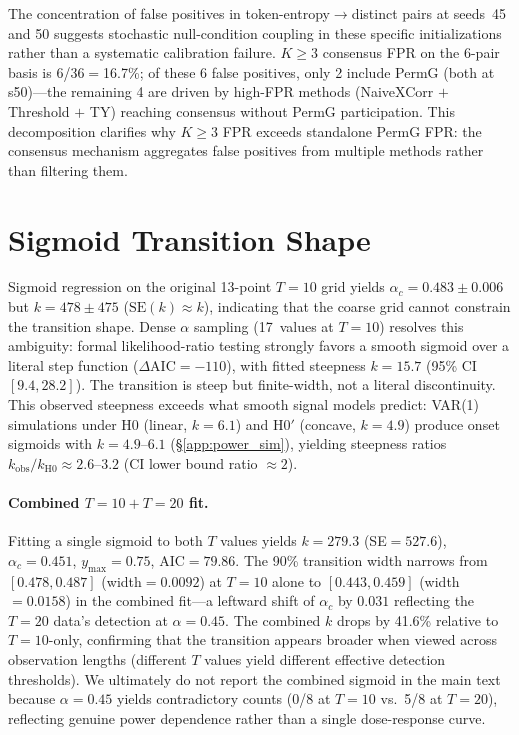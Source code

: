 The concentration of false positives in token-entropy$\to$distinct pairs at seeds~45 and 50 suggests stochastic null-condition coupling in these specific initializations rather than a systematic calibration failure.
$K{\geq}3$ consensus FPR on the 6-pair basis is 6/36${=}$16.7\%; of these 6 false positives, only 2 include PermG (both at s50)---the remaining 4 are driven by high-FPR methods (NaiveXCorr $+$ Threshold $+$ TY) reaching consensus without PermG participation.
This decomposition clarifies why $K{\geq}3$ FPR exceeds standalone PermG FPR: the consensus mechanism aggregates false positives from multiple methods rather than filtering them.

\FloatBarrier
\section{Sigmoid Transition Shape}
\label{app:sigmoid_shape}

Sigmoid regression on the original 13-point $T{=}10$ grid yields $\alpha_c = 0.483 \pm 0.006$ but $k = 478 \pm 475$ ($\mathrm{SE}(k) \approx k$), indicating that the coarse grid cannot constrain the transition shape.
Dense $\alpha$ sampling (17~values at $T{=}10$) resolves this ambiguity: formal likelihood-ratio testing strongly favors a smooth sigmoid over a literal step function ($\Delta\mathrm{AIC}{=}-110$), with fitted steepness $k{=}15.7$ (95\% CI $[9.4, 28.2]$).
The transition is steep but finite-width, not a literal discontinuity.
This observed steepness exceeds what smooth signal models predict: VAR(1) simulations under H0 (linear, $k{=}6.1$) and H0$'$ (concave, $k{=}4.9$) produce onset sigmoids with $k{=}4.9$--$6.1$ (\S\ref{app:power_sim}), yielding steepness ratios $k_{\mathrm{obs}} / k_{\mathrm{H0}} \approx 2.6$--$3.2$ (CI lower bound ratio ${\approx}2$).

\paragraph{Combined $T{=}10 + T{=}20$ fit.}
Fitting a single sigmoid to both $T$ values yields $k{=}279.3$ (SE${=}527.6$), $\alpha_c{=}0.451$, $y_{\max}{=}0.75$, AIC${=}79.86$.
The 90\% transition width narrows from $[0.478, 0.487]$ (width$=0.0092$) at $T{=}10$ alone to $[0.443, 0.459]$ (width$=0.0158$) in the combined fit---a leftward shift of $\alpha_c$ by $0.031$ reflecting the $T{=}20$ data's detection at $\alpha{=}0.45$.
The combined $k$ drops by 41.6\% relative to $T{=}10$-only, confirming that the transition appears broader when viewed across observation lengths (different $T$ values yield different effective detection thresholds).
We ultimately do not report the combined sigmoid in the main text because $\alpha{=}0.45$ yields contradictory counts (0/8 at $T{=}10$ vs.\ 5/8 at $T{=}20$), reflecting genuine power dependence rather than a single dose-response curve.

